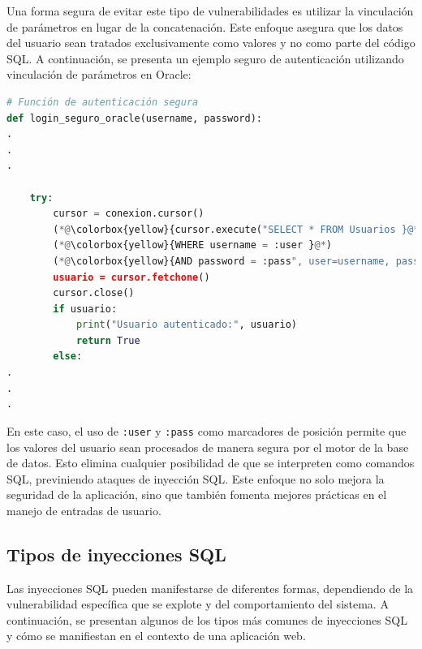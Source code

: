 \documentclass[a4paper,12pt]{article}
\begin{document}
 Una forma segura de evitar este tipo de vulnerabilidades es utilizar la vinculación de parámetros en lugar de la concatenación. Este enfoque asegura que los datos del usuario sean tratados exclusivamente como valores y no como parte del código SQL. A continuación, se presenta un ejemplo seguro de autenticación utilizando vinculación de parámetros en Oracle:
 \vspace{0,5cm}

 \begin{lstlisting}[language=Python]
 # Función de autenticación segura
def login_seguro_oracle(username, password):
.
.
.

    try:
        cursor = conexion.cursor()
        (*@\colorbox{yellow}{cursor.execute("SELECT * FROM Usuarios }@*)
        (*@\colorbox{yellow}{WHERE username = :user }@*)
        (*@\colorbox{yellow}{AND password = :pass", user=username, pass=password)}@*)
        usuario = cursor.fetchone()
        cursor.close()
        if usuario:
            print("Usuario autenticado:", usuario)
            return True
        else:
.
.
.
 \end{lstlisting}
 \vspace{0,5cm}

 En este caso, el uso de \texttt{:user} y \texttt{:pass} como marcadores de posición permite que los valores del usuario sean procesados de manera segura por el motor de la base de datos. Esto elimina cualquier posibilidad de que se interpreten como comandos SQL, previniendo ataques de inyección SQL. Este enfoque no solo mejora la seguridad de la aplicación, sino que también fomenta mejores prácticas en el manejo de entradas de usuario.
 
    \subsection{Tipos de inyecciones SQL}
    Las inyecciones SQL pueden manifestarse de diferentes formas, dependiendo de la vulnerabilidad específica que se explote y del comportamiento del sistema. A continuación, se presentan algunos de los tipos más comunes de inyecciones SQL y cómo se manifiestan en el contexto de una aplicación web.
    \vspace{0,5cm}
\end{document}
